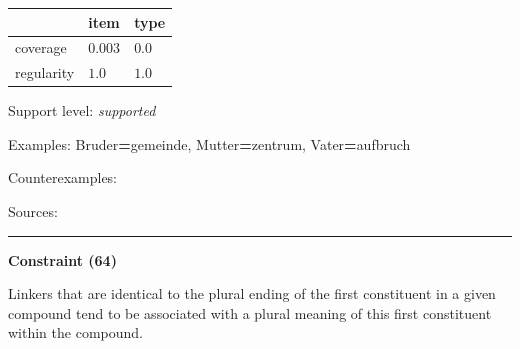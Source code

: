 \vspace{-0.25em}

\begin{table}[!ht]
\begin{center}
\setlength{\extrarowheight}{1pt}
\begin{tabularx}{\columnwidth}{|X|X|X|}
\hline
 & item & type \\
\hline
 coverage & $0.003$ & $0.0$ \\
\hline
 regularity & $1.0$ & $1.0$ \\
\hline
\end{tabularx}
\end{center}
\end{table}

\vspace{-1.35em}

\noindent
Support level: \textit{supported}

\vspace{0.3em}

\noindent
Examples: Bruder\textbf{=}gemeinde, Mutter\textbf{=}zentrum, Vater\textbf{=}aufbruch

\noindent
Counterexamples: 

\vspace{0.3em}

\noindent
Sources: \citet[5]{nuebling_szczepaniak_2008}

\vspace{0.35em}
\hrule




\vspace{0.4em}

\begin{center}
\textbf{Constraint (64)}
\end{center}

\noindent
Linkers that are identical to the plural ending of the first constituent in a given compound tend to be associated with a plural meaning of this first constituent within the compound.
\vspace{0.5em}


